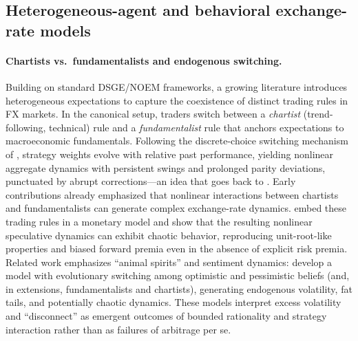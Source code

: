 \documentclass[a4paper,10pt,final]{article}    %
\begin{document}
\subsection{Heterogeneous-agent and behavioral exchange-rate models}
\label{subsec:ham}

\paragraph{Chartists vs.\ fundamentalists and endogenous switching.}
Building on standard DSGE/NOEM frameworks, a growing literature introduces heterogeneous expectations to capture the coexistence of distinct trading rules in FX markets. In the canonical setup, traders switch between a \emph{chartist} (trend-following, technical) rule and a \emph{fundamentalist} rule that anchors expectations to macroeconomic fundamentals. Following the discrete-choice switching mechanism of \citet{BrockHommes1997}, strategy weights evolve with relative past performance, yielding nonlinear aggregate dynamics with persistent swings and prolonged parity deviations, punctuated by abrupt corrections---an idea that goes back to \citet{FrankelFroot1990}.
Early contributions already emphasized that nonlinear interactions between chartists and fundamentalists can generate complex exchange-rate dynamics. \citet{de1993chaotic} embed these trading rules in a monetary model and show that the resulting nonlinear speculative dynamics can exhibit chaotic behavior, reproducing unit-root-like properties and biased forward premia even in the absence of explicit risk premia. Related work emphasizes ``animal spirits'' and sentiment dynamics: \citet{de2012animal} develop a model with evolutionary switching among optimistic and pessimistic beliefs (and, in extensions, fundamentalists and chartists), generating endogenous volatility, fat tails, and potentially chaotic dynamics. These models interpret excess volatility and ``disconnect'' as emergent outcomes of bounded rationality and strategy interaction rather than as failures of arbitrage per se.
\end{document}
